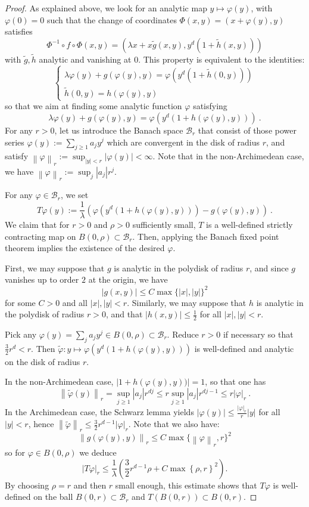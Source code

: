 \documentclass[11 pt, oneside, a4paper]{amsart}
\newcommand{\norm}[1]{\left\|#1\right\|}
\newcommand{\abs}[1]{{\left|{#1}\right|}}
\newcommand{\set}[1]{{\left\{#1\right\}}}
\newcommand{\lrpar}[1]{\left(#1\right)}
\theoremstyle{definition}
\theoremstyle{definition}
\begin{document}
\begin{proof}
As explained above, we look for an analytic map 
$y \mapsto \varphi(y)$, with $\varphi(0)=0$
such that 
the change of coordinates $\Phi(x,y) = (x + \varphi(y), y)$
satisfies
\[
\Phi^{-1}\circ f \circ \Phi (x,y) = (\lambda x + x \tilde{g}(x,y), y^d(1+\tilde{h}(x,y)))\]
with $\tilde{g}, \tilde{h}$ analytic and vanishing at $0$. 
This property is equivalent to the identities:
\[
\begin{cases}
\lambda \varphi(y)+ g(\varphi(y),y) = \varphi(y^d (1+ \tilde{h}(0,y)))
\\
\tilde{h}(0,y) = h(\varphi(y),y)
\end{cases}
\]
so that we aim at finding some analytic function $\varphi$ satisfying
\[\lambda \varphi(y)+ g(\varphi(y),y) = \varphi(y^d (1+ h(\varphi(y),y)))
~.\]
For any $r >0$, let us introduce the Banach space $\mathcal{B}_r$
that consist of those power series $\varphi(y) := \sum_{j\ge 1} a_j y^j$ which are convergent in the
disk of radius $r$, and satisfy 
$\norm{\varphi}_r := \sup_{|y|<r}  |\varphi(y)| < \infty$.
Note that in the non-Archimedean case, we have $\norm{\varphi}_r := \sup_j  |a_j| r^j$.

For any $\varphi \in \mathcal{B}_r$, we set
\[T\varphi (y) := \frac{1}{\lambda} \left( \varphi(y^d (1+ h(\varphi(y),y))) - g(\varphi(y),y) \right)~.\]
We claim that for $r>0$ and $\rho>0$ sufficiently small, 
$T$ is a well-defined strictly contracting map on $B(0,\rho)\subset \mathcal{B}_r$. 
Then, applying the   Banach fixed point theorem implies the existence of the desired $\varphi$. 

First, we may suppose that $g$ is analytic in the polydisk of radius $r$, and since $g$ vanishes up to order $2$ at the origin, we have 
\[ \abs{g(x,y)} \le C \max \{ |x|, |y|\}^2\]
for some $C>0$ and all $|x|, |y| < r$. Similarly, we may suppose that $h$  is analytic in the polydisk of radius $r>0$, 
and that $|h(x,y)| \le \frac12$ for all $|x|, |y| < r$.

Pick any  $\varphi(y) = \sum_j a_j y^j \in B(0,\rho)\subset \mathcal{B}_r$.
Reduce $r>0$ if necessary so that $\frac32 r^d <r$.
Then $\tilde{\varphi} :y\mapsto  \varphi (y^d (1+h(\varphi(y),y)))$
is well-defined and analytic on the disk of radius $r$.

In the non-Archimedean case, 
$|1+h(\varphi(y),y))| = 1$, so that 
one has
\[
\norm{\tilde{\varphi}(y)}_r = \sup_{j\ge1} \abs{a_j} r^{dj} \le r \sup_{j\ge1} \abs{a_j} r^{dj-1} \le r |\varphi|_r~.\]
In the Archimedean case, the Schwarz lemma yields
$|\varphi(y)| \le \frac{|\varphi|_r}r |y|$ for all $|y| <r$, hence 
$\norm{\tilde{\varphi}}_r \le \frac32 r^{d-1} |\varphi|_r $.
Note that we also have:
\[\norm{g(\varphi(y),y)}_r \le C \max \{\norm{\varphi}_r, r\}^2  \]
so for $\varphi\in B(0, \rho) $ we deduce  
\[|T\varphi|_r \le \frac1{\lambda}  \lrpar{\frac32 r^{d-1} \rho + C \max\set{\rho, r}^2}.\] 
By choosing $\rho = r$ and then $r$ small enough, this estimate
shows that $T\varphi$ is well-defined on the ball  $B(0,r)\subset \mathcal{B}_r$ and
$T(B(0,r)) \subset B(0,r)$. 


\end{proof}
\end{document}
